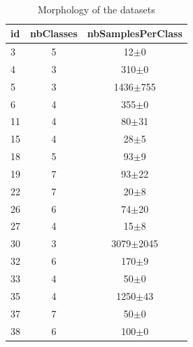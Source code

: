 \documentclass[12pt,a4paper,fleqn]{tufte-handout}
\begin{document}
 
\begin{table}    
\begin{center}    
\    
\setlength{\tabcolsep}{.16667em}    
\begin{tabular}{lcc}    
id & nbClasses & nbSamplesPerClass \\    
\hline    
3 & 5 &      12$\pm$0 \\    
4 & 3 &     310$\pm$0 \\    
5 & 3 &  1436$\pm$755 \\    
6 & 4 &     355$\pm$0 \\    
11 & 4 &     80$\pm$31 \\    
15 & 4 &      28$\pm$5 \\    
18 & 5 &      93$\pm$9 \\    
19 & 7 &     93$\pm$22 \\    
22 & 7 &      20$\pm$8 \\    
26 & 6 &     74$\pm$20 \\    
27 & 4 &      15$\pm$8 \\    
30 & 3 & 3079$\pm$2045 \\    
32 & 6 &     170$\pm$9 \\    
33 & 4 &      50$\pm$0 \\    
35 & 4 &   1250$\pm$43 \\    
37 & 7 &      50$\pm$0 \\    
38 & 6 &     100$\pm$0 \\    
\end{tabular}    
\end{center}    
\caption{Morphology of the datasets}    
\label{didtNoda1}    
\end{table}    
 
\end{document}
